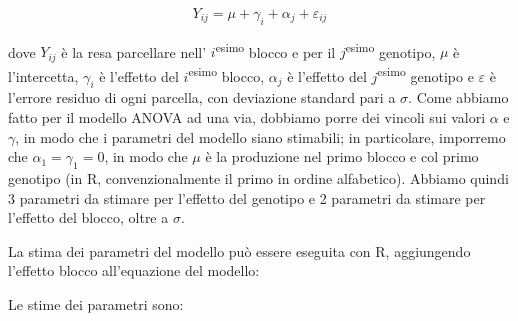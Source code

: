 \documentclass[
  12pt,
]{book}
\newenvironment{Shaded}{\begin{snugshade}}{\end{snugshade}}
\newcommand{\AttributeTok}[1]{\textcolor[rgb]{0.77,0.63,0.00}{#1}}
\newcommand{\CommentTok}[1]{\textcolor[rgb]{0.56,0.35,0.01}{\textit{#1}}}
\newcommand{\DocumentationTok}[1]{\textcolor[rgb]{0.56,0.35,0.01}{\textbf{\textit{#1}}}}
\newcommand{\FunctionTok}[1]{\textcolor[rgb]{0.00,0.00,0.00}{#1}}
\newcommand{\NormalTok}[1]{#1}
\newcommand{\OtherTok}[1]{\textcolor[rgb]{0.56,0.35,0.01}{#1}}
\newcommand{\SpecialCharTok}[1]{\textcolor[rgb]{0.00,0.00,0.00}{#1}}
\newcommand{\StringTok}[1]{\textcolor[rgb]{0.31,0.60,0.02}{#1}}
\begin{document}
\[ Y_{ij} = \mu + \gamma_i + \alpha_j + \varepsilon_{ij}\]

dove \(Y_{ij}\) è la resa parcellare nell' \(i\)\textsuperscript{esimo} blocco e per il \(j\)\textsuperscript{esimo} genotipo, \(\mu\) è l'intercetta, \(\gamma_i\) è l'effetto del \(i\)\textsuperscript{esimo} blocco, \(\alpha_j\) è l'effetto del \(j\)\textsuperscript{esimo} genotipo e \(\varepsilon\) è l'errore residuo di ogni parcella, con deviazione standard pari a \(\sigma\). Come abbiamo fatto per il modello ANOVA ad una via, dobbiamo porre dei vincoli sui valori \(\alpha\) e \(\gamma\), in modo che i parametri del modello siano stimabili; in particolare, imporremo che \(\alpha_1 = \gamma_1 = 0\), in modo che \(\mu\) è la produzione nel primo blocco e col primo genotipo (in R, convenzionalmente il primo in ordine alfabetico). Abbiamo quindi 3 parametri da stimare per l'effetto del genotipo e 2 parametri da stimare per l'effetto del blocco, oltre a \(\sigma\).

La stima dei parametri del modello può essere eseguita con R, aggiungendo l'effetto blocco all'equazione del modello:

\begin{Shaded}
\end{Shaded}

Le stime dei parametri sono:

\begin{Shaded}
\end{Shaded}
\end{document}
